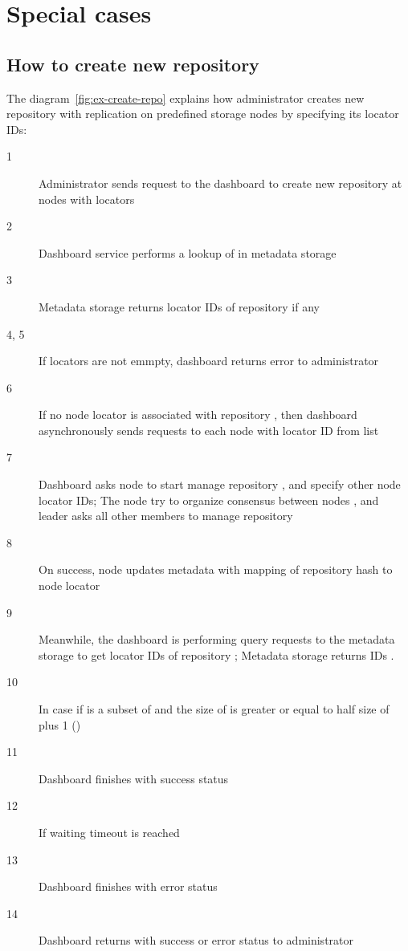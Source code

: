 \section{Special cases}\label{sec:explanation}
\subsection{How to create new repository}

The diagram~\ref{fig:ex-create-repo} explains how administrator creates new repository with replication
on predefined storage nodes by specifying its locator IDs:
\begin{description}
  \item[1] Administrator sends request to the dashboard to create new repository  at nodes with locators
  \item[2] Dashboard service performs a lookup of  in metadata storage
  \item[3] Metadata storage returns locator IDs  of  repository if any
  \item[4, 5] If  locators are not emmpty, dashboard returns error to administrator
  \item[6] If no node locator is associated with repository , then dashboard asynchronously sends
    requests to each node with locator ID  from list 
  \item[7] Dashboard asks node  to start manage repository , and specify other node locator IDs;
    The node  try to organize consensus between nodes , and leader asks all other members
    to manage repository 
  \item[8] On success, node  updates metadata with mapping of repository  hash to
    node locator 
  \item[9] Meanwhile, the dashboard is performing query requests to the metadata storage to get locator IDs of
    repository ; Metadata storage returns IDs .
  \item[10] In case if  is a subset of  and the size of  is greater or equal to
    half size of  plus 1 ()
  \item[11] Dashboard finishes with success status
  \item[12] If waiting timeout is reached
  \item[13] Dashboard finishes with error status
  \item[14] Dashboard returns with success or error status to administrator

\end{description}
